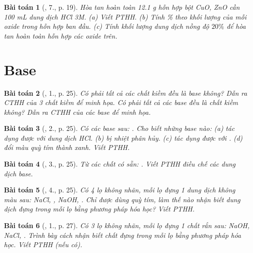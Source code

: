 \documentclass{article}
\newtheorem{baitoan}{Bài toán}
\begin{document}
\begin{baitoan}[\cite{SGK_Hoa_Hoc_9}, 7., p. 19]
	Hòa tan hoàn toàn {\rm12.1 g} hỗn hợp bột {\rm CuO, ZnO} cần {\rm100 mL} dung dịch {\rm HCl 3M}. (a) Viết {\rm PTHH}. (b) Tính \% theo khối lượng của mỗi oxide trong hỗn hợp ban đầu. (c) Tính khối lượng dung dịch {\rm{}} nồng độ $20\%$ để hòa tan hoàn toàn hỗn hợp các oxide trên.
\end{baitoan}


\section{Base}

\begin{baitoan}[\cite{SGK_Hoa_Hoc_9}, 1., p. 25]
	Có phải tất cả các chất kiềm đều là base không? Dẫn ra CTHH của 3 chất kiềm để minh họa. Có phải tất cả các base đều là chất kiềm không? Dẫn ra CTHH của các base để minh họa.
\end{baitoan}

\begin{baitoan}[\cite{SGK_Hoa_Hoc_9}, 2., p. 25]
	Có các base sau: {\rm{}}. Cho biết những base nào: (a) tác dụng được với dung dịch {\rm HCl}. (b) bị nhiệt phân hủy. (c) tác dụng được với {\rm{}}. (d) đổi màu quỳ tím thành xanh. Viết {\rm PTHH}.
\end{baitoan}

\begin{baitoan}[\cite{SGK_Hoa_Hoc_9}, 3., p. 25]
	Từ các chất có sẵn: {\rm{}}. Viết {\rm PTHH} điều chế các dung dịch base.
\end{baitoan}

\begin{baitoan}[\cite{SGK_Hoa_Hoc_9}, 4., p. 25]
	Có 4 lọ không nhãn, mỗi lọ đựng 1 dung dịch không màu sau: {\rm NaCl, , NaOH, }. Chỉ được dùng quỳ tím, làm thế nào nhận biết dung dịch đựng trong mỗi lọ bằng phương pháp hóa học? Viết {\rm PTHH}.
\end{baitoan}

\begin{baitoan}[\cite{SGK_Hoa_Hoc_9}, 1., p. 27]
	Có 3 lọ không nhãn, mỗi lọ đựng 1 chất rắn sau: {\rm NaOH, NaCl, }. Trình bày cách nhận biết chất đựng trong mỗi lọ bằng phương pháp hóa học. Viết {\rm PTHH} (nếu có).
\end{baitoan}
\end{document}
